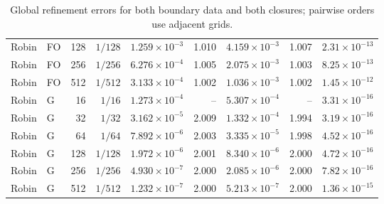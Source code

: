 \begin{table}[htbp]
\begin{tabular}{llrrrrrrr}
Robin & FO & 128 & $1/128$ & $1.259\times10^{-3}$ & 1.010 & $4.159\times10^{-3}$ & 1.007 & $2.31\times10^{-13}$ \\
Robin & FO & 256 & $1/256$ & $6.276\times10^{-4}$ & 1.005 & $2.075\times10^{-3}$ & 1.003 & $8.25\times10^{-13}$ \\
Robin & FO & 512 & $1/512$ & $3.133\times10^{-4}$ & 1.002 & $1.036\times10^{-3}$ & 1.002 & $1.45\times10^{-12}$ \\
Robin & G & 16 & $1/16$ & $1.273\times10^{-4}$ & -- & $5.307\times10^{-4}$ & -- & $3.31\times10^{-16}$ \\
Robin & G & 32 & $1/32$ & $3.162\times10^{-5}$ & 2.009 & $1.332\times10^{-4}$ & 1.994 & $3.19\times10^{-16}$ \\
Robin & G & 64 & $1/64$ & $7.892\times10^{-6}$ & 2.003 & $3.335\times10^{-5}$ & 1.998 & $4.52\times10^{-16}$ \\
Robin & G & 128 & $1/128$ & $1.972\times10^{-6}$ & 2.001 & $8.340\times10^{-6}$ & 2.000 & $4.72\times10^{-16}$ \\
Robin & G & 256 & $1/256$ & $4.930\times10^{-7}$ & 2.000 & $2.085\times10^{-6}$ & 2.000 & $7.82\times10^{-16}$ \\
Robin & G & 512 & $1/512$ & $1.232\times10^{-7}$ & 2.000 & $5.213\times10^{-7}$ & 2.000 & $1.36\times10^{-15}$ \\
\bottomrule
\end{tabular}
\caption{Global refinement errors for both boundary data and both closures; pairwise orders use adjacent grids.}
\label{tab:refinement-combined}
\end{table}
